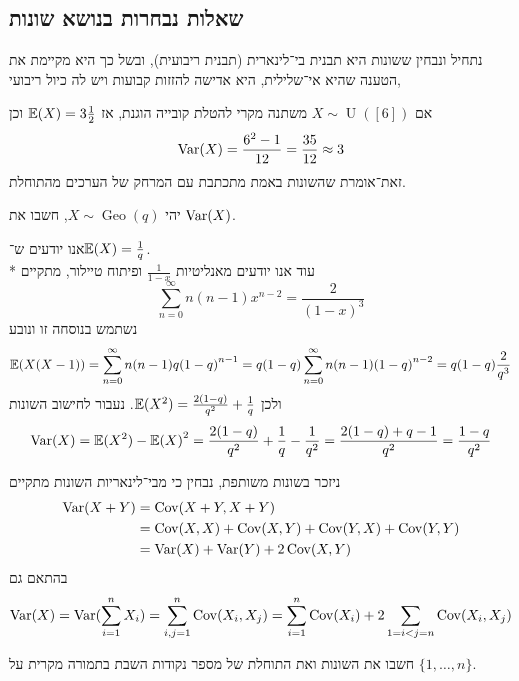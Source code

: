 \subsection{שאלות נבחרות בנושא שונות}
נתחיל ונבחין ששונות היא תבנית בי־לינארית (תבנית ריבועית), ובשל כך היא מקיימת את הטענה שהיא אי־שלילית, היא אדישה להזזות קבועות ויש לה כיול ריבועי,
\begin{example}
	אם $X \sim \operatorname{U}([6])$ משתנה מקרי להטלת קובייה הוגנת, אז $\mathbb{E}(X) = 3 \frac{1}{2}$ וכן
	\[
		\operatorname{Var}(X) = \frac{6^2 - 1}{12} = \frac{35}{12} \approx 3
	\]
	זאת־אומרת שהשונות באמת מתכתבת עם המרחק של הערכים מהתוחלת.
\end{example}
\begin{exercise}
	יהי $X \sim \operatorname{Geo}(q)$, חשבו את $\operatorname{Var}(X)$.
\end{exercise}
\begin{solution}
	אנו יודעים ש־$\mathbb{E}(X) = \frac{1}{q}$. \\*
	עוד אנו יודעים מאנליטיות $\frac{1}{1 - x}$ ופיתוח טיילור, מתקיים
	\[
		\sum_{n = 0}^{\infty} n (n - 1) x^{n - 2} = \frac{2}{{(1 - x)}^3}
	\]
	נשתמש בנוסחה זו ונובע
	\[
		\mathbb{E}(X(X - 1))
		= \sum_{n = 0}^{\infty} n (n - 1) q {(1 - q)}^{n - 1}
		= q (1 - q) \sum_{n = 0}^{\infty} n (n - 1) {(1 - q)}^{n - 2}
		= q (1 - q) \frac{2}{q^3}
	\]
	ולכן $\mathbb{E}(X^2) = \frac{2(1 - q)}{q^2} + \frac{1}{q}$.
	נעבור לחישוב השונות
	\[
		\operatorname{Var}(X)
		= \mathbb{E}(X^2) - {\mathbb{E}(X)}^2
		= \frac{2(1 - q)}{q^2} + \frac{1}{q} - \frac{1}{q^2}
		= \frac{2(1 - q) + q - 1}{q^2}
		= \frac{1 - q}{q^2}
	\]
\end{solution}
ניזכר בשונות משותפת, נבחין כי מבי־לינאריות השונות מתקיים
\begin{align*}
	\operatorname{Var}(X + Y)
	& = \operatorname{Cov}(X + Y, X + Y) \\
	& = \operatorname{Cov}(X, X) + \operatorname{Cov}(X, Y) + \operatorname{Cov}(Y, X) + \operatorname{Cov}(Y, Y) \\
	& = \operatorname{Var}(X) + \operatorname{Var}(Y) + 2 \operatorname{Cov}(X, Y)
\end{align*}
בהתאם גם
\[
	\operatorname{Var}(X)
	= \operatorname{Var}(\sum_{i = 1}^{n} X_i)
	= \sum_{i, j = 1}^{n} \operatorname{Cov}(X_i, X_j)
	= \sum_{i = 1}^{n} \operatorname{Cov}(X_i) + 2 \sum_{1 = i < j = n} \operatorname{Cov}(X_i, X_j)
\]
\begin{exercise}
	חשבו את השונות ואת התוחלת של מספר נקודות השבת בתמורה מקרית על $\{1, \dots, n\}$.
\end{exercise}
